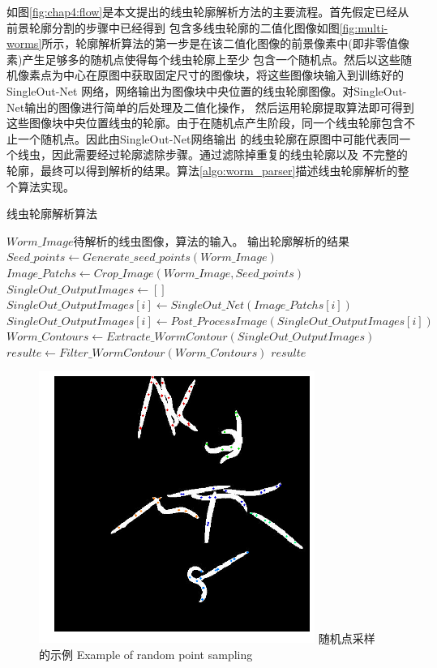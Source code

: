 	如图\ref{fig:chap4:flow}是本文提出的线虫轮廓解析方法的主要流程。首先假定已经从前景轮廓分割的步骤中已经得到
	包含多线虫轮廓的二值化图像如图\ref{fig:multi-worms}所示，轮廓解析算法的第一步是在该二值化图像的前景像素中(即非零值像素)产生足够多的随机点使得每个线虫轮廓上至少
	包含一个随机点。然后以这些随机像素点为中心在原图中获取固定尺寸的图像块，将这些图像块输入到训练好的SingleOut-Net
	网络，网络输出为图像块中央位置的线虫轮廓图像。对SingleOut-Net输出的图像进行简单的后处理及二值化操作，
	然后运用轮廓提取算法即可得到这些图像块中央位置线虫的轮廓。由于在随机点产生阶段，同一个线虫轮廓包含不止一个随机点。因此由SingleOut-Net网络输出
	的线虫轮廓在原图中可能代表同一个线虫，因此需要经过轮廓滤除步骤。通过滤除掉重复的线虫轮廓以及
	不完整的轮廓，最终可以得到解析的结果。算法\ref{algo:worm_parser}描述线虫轮廓解析的整个算法实现。
	\begin{algorithm}
	\caption{线虫轮廓解析算法}
	\label{algo:worm_parser}
	\begin{algorithmic}[1]
	\Require $Worm\_Image$待解析的线虫图像，算法的输入。
	\Ensure 输出轮廓解析的结果
			\State $Seed\_points \gets Generate\_seed\_points(Worm\_Image)$
			\State $Image\_Patchs \gets Crop\_Image(Worm\_Image,Seed\_points)$
			\State $SingleOut\_OutputImages \gets []$
				\State $SingleOut\_OutputImages[i] \gets SingleOut\_Net(Image\_Patchs[i])$
				\State $SingleOut\_OutputImages[i] \gets Post\_ProcessImage(SingleOut\_OutputImages[i])$
			\EndFor
			\State $Worm\_Contours \gets Extracte\_WormContour(SingleOut\_OutputImages)$
			\State $resulte \gets Filter\_WormContour(Worm\_Contours)$
			\State \Return $resulte$
	\EndFunction
	\end{algorithmic}
	\end{algorithm}
	\begin{figure}[htp]
	  \centering
	  \includegraphics[width=9cm]{figure/chap4/rand_seed.png}
	  \bicaption
		{随机点采样的示例}
		{Example of random point sampling}
	  \label{fig:chap4:rand_seed}
	\end{figure}
